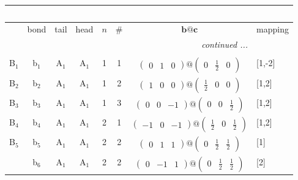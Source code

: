 \documentclass[fleqn,10pt,landscape]{article}
\begin{document}
\begin{itemize}
\begin{center}
\begin{longtable}{cc|cc|c|c|c|l}
\multicolumn{7}{l}{\tablename\ \thetable{}} \\
 \hline \hline
 & bond & tail & head & $n$ & \# & $\bm{b}@\bm{c}$ & mapping \\ \hline \endhead

 \hline \hline
\multicolumn{7}{r}{\footnotesize\it continued ...} \\ \endfoot

 \hline \hline
\multicolumn{7}{r}{} \\ \endlastfoot

B$_{1}$ & b$_{1}$ & A$_{1}$ & A$_{1}$ & 1 & 1 & $\begin{pmatrix} 0 & 1 & 0 \end{pmatrix}@\begin{pmatrix} 0 & \frac{1}{2} & 0 \end{pmatrix}$ & [1,-2] \\ \hline
B$_{2}$ & b$_{2}$ & A$_{1}$ & A$_{1}$ & 1 & 2 & $\begin{pmatrix} 1 & 0 & 0 \end{pmatrix}@\begin{pmatrix} \frac{1}{2} & 0 & 0 \end{pmatrix}$ & [1,2] \\ \hline
B$_{3}$ & b$_{3}$ & A$_{1}$ & A$_{1}$ & 1 & 3 & $\begin{pmatrix} 0 & 0 & -1 \end{pmatrix}@\begin{pmatrix} 0 & 0 & \frac{1}{2} \end{pmatrix}$ & [1,2] \\ \hline
B$_{4}$ & b$_{4}$ & A$_{1}$ & A$_{1}$ & 2 & 1 & $\begin{pmatrix} -1 & 0 & -1 \end{pmatrix}@\begin{pmatrix} \frac{1}{2} & 0 & \frac{1}{2} \end{pmatrix}$ & [1,2] \\ \hline
B$_{5}$ & b$_{5}$ & A$_{1}$ & A$_{1}$ & 2 & 2 & $\begin{pmatrix} 0 & 1 & 1 \end{pmatrix}@\begin{pmatrix} 0 & \frac{1}{2} & \frac{1}{2} \end{pmatrix}$ & [1] \\
& b$_{6}$ & A$_{1}$ & A$_{1}$ & 2 & 2 & $\begin{pmatrix} 0 & -1 & 1 \end{pmatrix}@\begin{pmatrix} 0 & \frac{1}{2} & \frac{1}{2} \end{pmatrix}$ & [2] \\ \hline

\end{longtable}
\end{center}
\end{itemize}
\end{document}
